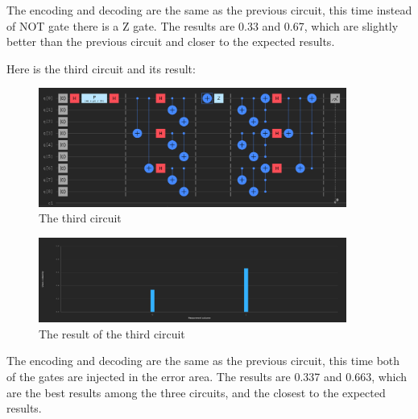 \documentclass[12pt]{article}
\begin{document}
The encoding and decoding are the same as the previous circuit, this time instead of NOT gate there is a Z gate. The results are 0.33 and 0.67, which are slightly better than the previous circuit and closer to the expected results.

\newpage

Here is the third circuit and its result:

\begin{figure}[H]
    \centering
    \includegraphics[width=0.9\textwidth]{shor3.png}
    \caption{The third circuit}
\end{figure}

\begin{figure}[H]
    \centering
    \includegraphics[width=0.9\textwidth]{shor3R.png}
    \caption{The result of the third circuit}
\end{figure}

The encoding and decoding are the same as the previous circuit, this time both of the gates are injected in the error area. The results are 0.337 and 0.663, which are the best results among the three circuits, and the closest to the expected results.
\end{document}
